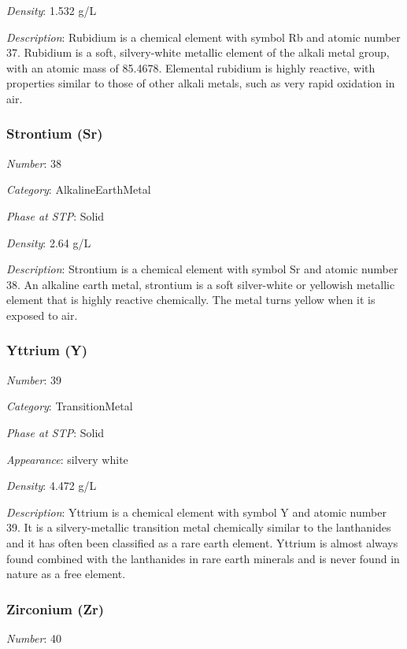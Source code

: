 \documentclass{article}
\begin{document}
\textit{Density}: 1.532 g/L

\textit{Description}: Rubidium is a chemical element with symbol Rb and atomic number 37. Rubidium is a soft, silvery-white metallic element of the alkali metal group, with an atomic mass of 85.4678. Elemental rubidium is highly reactive, with properties similar to those of other alkali metals, such as very rapid oxidation in air.

\hypertarget{subsubsection::Sr}{}\subsubsection{Strontium (Sr)}

\textit{Number}: 38

\textit{Category}: AlkalineEarthMetal

\textit{Phase at STP}: Solid

\textit{Density}: 2.64 g/L

\textit{Description}: Strontium is a chemical element with symbol Sr and atomic number 38. An alkaline earth metal, strontium is a soft silver-white or yellowish metallic element that is highly reactive chemically. The metal turns yellow when it is exposed to air.

\hypertarget{subsubsection::Y}{}\subsubsection{Yttrium (Y)}

\textit{Number}: 39

\textit{Category}: TransitionMetal

\textit{Phase at STP}: Solid

\textit{Appearance}: silvery white

\textit{Density}: 4.472 g/L

\textit{Description}: Yttrium is a chemical element with symbol Y and atomic number 39. It is a silvery-metallic transition metal chemically similar to the lanthanides and it has often been classified as a rare earth element. Yttrium is almost always found combined with the lanthanides in rare earth minerals and is never found in nature as a free element.

\hypertarget{subsubsection::Zr}{}\subsubsection{Zirconium (Zr)}

\textit{Number}: 40
\end{document}
